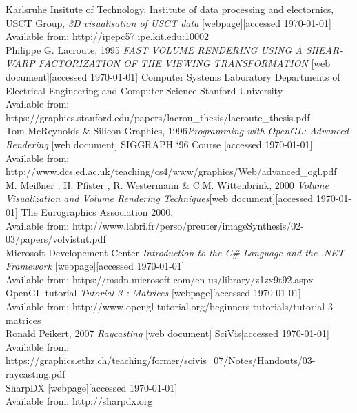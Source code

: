 \documentclass[twoside, english, 11pt]{report}
\begin{document}
\small Karlsruhe Insitute of Technology, Institute of data processing and electornics, USCT Group, \textit{3D visualisation of USCT data} [webpage][accessed \today] \\
Available from: http://ipepc57.ipe.kit.edu:10002\\

\small Philippe G. Lacroute, 1995 \textit{FAST VOLUME RENDERING USING A SHEAR-WARP FACTORIZATION OF THE VIEWING TRANSFORMATION} [web document][accessed \today] Computer Systems Laboratory
Departments of Electrical Engineering and Computer Science Stanford University \\
Available from: https://graphics.stanford.edu/papers/lacrou\_thesis/lacroute\_thesis.pdf\\

\small Tom McReynolds \& Silicon Graphics, 1996\textit{Programming with OpenGL: Advanced Rendering} [web document] SIGGRAPH ‘96 Course [accessed \today] \\
Available from: http://www.dcs.ed.ac.uk/teaching/cs4/www/graphics/Web/advanced\_ogl.pdf\\

\small M. Meißner , H. Pfister , R. Westermann \& C.M. Wittenbrink, 2000 \textit{Volume Visualization and Volume Rendering Techniques}[web document][accessed \today] The Eurographics Association 2000.\\
Available from: http://www.labri.fr/perso/preuter/imageSynthesis/02-03/papers/volvistut.pdf\\

\small Microsoft Developement Center \textit{Introduction to the C\# Language and the .NET Framework} [webpage][accessed \today] \\
Available from: https://msdn.microsoft.com/en-us/library/z1zx9t92.aspx\\

\small OpenGL-tutorial \textit{Tutorial 3 : Matrices} [webpage][accessed \today] \\
Available from: http://www.opengl-tutorial.org/beginners-tutorials/tutorial-3-matrices\\

\small Ronald Peikert, 2007 \textit{Raycasting} [web document] SciVis[accessed \today] \\
Available from: https://graphics.ethz.ch/teaching/former/scivis\_07/Notes/Handouts/03-raycasting.pdf\\

\small SharpDX [webpage][accessed \today] \\
Available from: http://sharpdx.org\\
\end{document}

